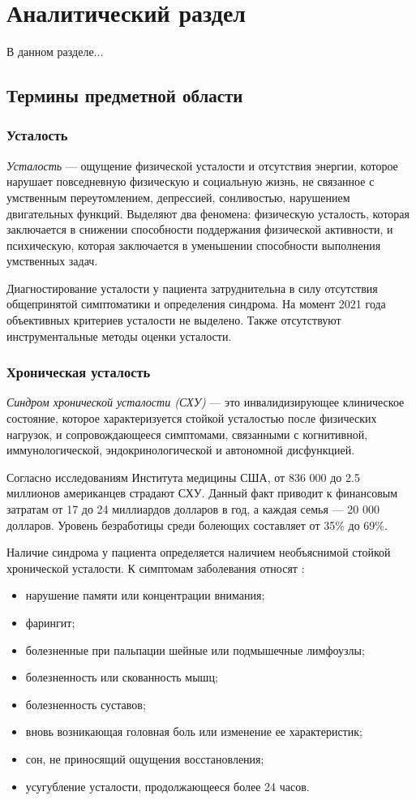 \section{Аналитический раздел}
В данном разделе...

\subsection{Термины предметной области}
\subsubsection{Усталость}
\textit{Усталость} --- ощущение физической усталости и отсутствия энергии, которое нарушает повседневную физическую и социальную жизнь, не связанное с умственным переутомлением, депрессией, сонливостью, нарушением двигательных функций. Выделяют два феномена: физическую усталость, которая заключается в снижении способности поддержания физической активности, и психическую, которая заключается в уменьшении способности выполнения умственных задач. \cite{fatigueAsSymptom}

Диагностирование усталости у пациента затруднительна в силу отсутствия общепринятой симптоматики и определения синдрома. На момент 2021 года объективных критериев усталости не выделено. Также отсутствуют инструментальные методы оценки усталости. \cite{fatigueAsSymptom}

\subsubsection{Хроническая усталость}
\textit{Синдром хронической усталости (СХУ)} --- это инвалидизирующее клиническое состояние, которое характеризуется стойкой усталостью после физических нагрузок, и сопровождающееся симптомами, связанными с когнитивной, иммунологической, эндокринологической и автономной дисфункцией. \cite{syndromOfChrono}

Согласно исследованиям Института медицины США, от 836 000 до 2.5 миллионов американцев страдают СХУ. Данный факт приводит к финансовым затратам от 17 до 24 миллиардов долларов в год, а каждая семья --- 20 000 долларов. Уровень безработицы среди болеющих составляет от 35\% до 69\%. \cite{fatigueChronoInvestigation}

Наличие синдрома у пациента определяется наличием необъяснимой стойкой хронической усталости. К симптомам заболевания относят \cite{syndromOfChrono}:
\begin{itemize}[leftmargin=1.6\parindent]
\item нарушение памяти или концентрации внимания;
\item фарингит;
\item болезненные при пальпации шейные или подмышечные лимфоузлы;
\item болезненность или скованность мышц;
\item болезненность суставов;
\item вновь возникающая головная боль или изменение ее характеристик;
\item сон, не приносящий ощущения восстановления;
\item усугубление усталости, продолжающееся более 24 часов.
\end{itemize}

